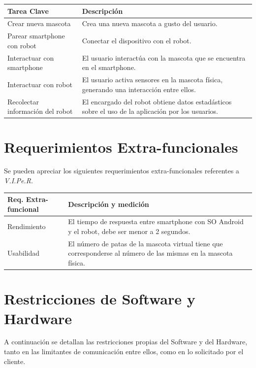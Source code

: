 \documentclass[letterpaper,12pt]{article} %
\numberwithin{equation}{section} %
\numberwithin{figure}{section} %
\numberwithin{table}{section} %
\begin{document}
\begin{table}[H]
  \centering
  \begin{tabular}{p{5cm}p{9cm}}\hline
    Tarea Clave & Descripci\'on \\ \hline\hline %
    Crear nueva mascota & Crea una nueva mascota a gusto del usuario. \\ \hline
    Parear smartphone con robot & Conectar el dispositivo con el robot. \\ \hline
    Interactuar con smartphone & El usuario interact\'ua con la mascota que se encuentra en el smartphone. \\ \hline
    Interactuar con robot & El usuario activa sensores en la mascota f\'isica, generando una interacci\'on entre ellos. \\ \hline
    Recolectar informaci\'on del robot & El encargado del robot obtiene datos estad\'asticos sobre el uso de la aplicaci\'on por los usuarios. \\ \hline\hline
  \end{tabular}
\end{table}

\newpage
\section{Requerimientos Extra-funcionales}

Se pueden apreciar los siguientes requerimientos extra-funcionales referentes a \emph{V.I.Pe.R.}

\begin{table}[H]
  \centering
  \begin{tabular}{p{5cm}p{9cm}}\hline 
    Req. Extra-funcional & Descripci\'on y medici\'on \\ \hline\hline %
    Rendimiento & El tiempo de respuesta entre smartphone con SO Android y el robot, debe ser menor a 2 segundos.\\\hline
    Usabilidad & El n\'umero de patas de la mascota virtual tiene que corresponderse al n\'umero de las mismas en la mascota f\'isica.\\ \hline\hline
  \end{tabular}
\end{table}

\newpage
\section{Restricciones de Software y Hardware}

A continuaci\'on se detallan las restricciones propias del Software y del Hardware, tanto en las limitantes de comunicaci\'on entre ellos, como en lo solicitado por el cliente.\\
\end{document}
